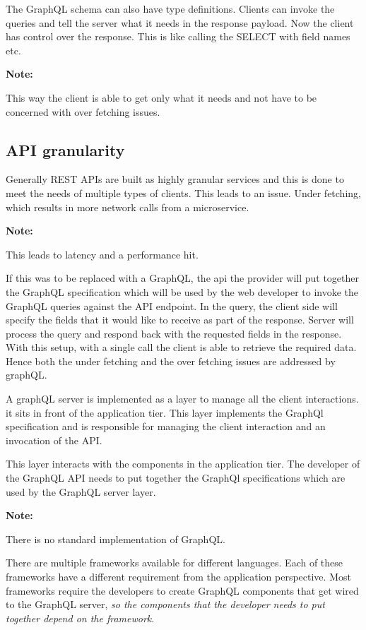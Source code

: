 \documentclass[a4paper, 11pt]{book}
\newenvironment{note}{
    \begin{siderule}
        \textbf{Note: }
        }{
    \end{siderule}
}
\begin{document}
    The GraphQL schema can also have type definitions.
    Clients can invoke the queries and tell the server what it needs in the response payload.
    Now the client has control over the response.
    This is like calling the SELECT with field names etc.
    \begin{note}
        This way the client is able to get only what it needs and not have to be concerned with over fetching issues.
    \end{note}

    \subsection{API granularity}
    Generally REST APIs are built as highly granular services and this is done to meet the needs of multiple types of clients.
    This leads to an issue.
    Under fetching, which results in more network calls from a microservice.
    \begin{note}
        This leads to latency and a performance hit.
    \end{note}

    If this was to be replaced with a GraphQL, the api the provider will put together the GraphQL specification which will be used by the web developer to invoke the GraphQL queries against the API endpoint.
    In the query, the client side will specify the fields that it would like to receive as part of the response.
    Server will process the query and respond back with the requested fields in the response.
    With this setup, with a single call the client is able to retrieve the required data.
    Hence both the under fetching and the over fetching issues are addressed by graphQL.

    A graphQL server is implemented as a layer to manage all the client interactions.
    it sits in front of the application tier.
    This layer implements the GraphQl specification and is responsible for managing the client interaction and an invocation of the API.

    This layer interacts with the components in the application tier.
    The developer of the GraphQL API needs to put together the GraphQl specifications which are used by the GraphQL server layer.

    \begin{note}
        There is no standard implementation of GraphQL.
    \end{note}

    There are multiple frameworks available for different languages.
    Each of these frameworks have a different requirement from the application perspective.
    Most frameworks require the developers to create GraphQL components that get wired to the GraphQL server, \textit{so the components that the developer needs to put together depend on the framework}.
\end{document}

